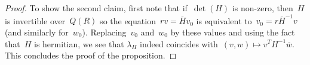 \documentclass[11pt,a4paper]{amsart}
\theoremstyle{definition}
\begin{document}
\begin{proof}
To show the second claim, first note that if~$\det(H)$ is non-zero, then~$H$ is invertible over~$Q(R)$ so the equation~$r v=\overline{H}v_0$ is equivalent to~$v_0=r\overline{H}^{-1} v$ (and similarly for~$w_0$). Replacing~$v_0$ and~$w_0$ by these values and using the fact that~$H$ is hermitian, we see that $\lambda_H$ indeed coincides with~$(v,w)\mapsto v^T H^{-1}\overline{w}$. This concludes the proof of the proposition.
%
%
\end{proof}
\end{document}
